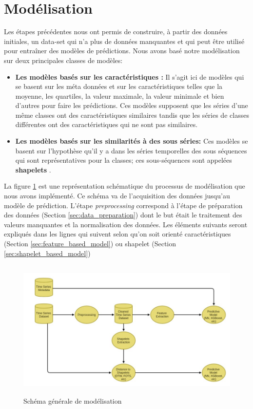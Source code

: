 \section{Modélisation}
Les étapes précédentes nous ont permis de construire, à partir des données initiales, un data-set qui n'a plus de données manquantes et qui peut être utilisé pour entraîner des modèles de prédictions. Nous avons basé notre modélisation sur deux principales classes de modèles:
\begin{itemize}
    \item \textbf{Les modèles basés sur les caractéristiques :} Il s'agit ici de modèles qui se basent sur les méta données et sur les caractéristiques telles que la moyenne, les quartiles, la valeur maximale, la valeur minimale et bien d'autres pour faire les prédictions. Ces modèles supposent que les séries d'une même classes ont des caractéristiques similaires tandis que les séries de classes différentes ont des caractéristiques qui ne sont pas similaires.
    \item \textbf{Les modèles basés sur les similarités à des sous séries:} Ces modèles se basent sur l'hypothèse qu'il y a dans les séries temporelles des sous séquences qui sont représentatives pour la classes; ces sous-séquences sont appelées \textbf{shapelets} \citep{ye2009time}.
\end{itemize}
La figure \ref{fig:modeling_shema} est une représentation schématique du processus de modélisation que nous avons implémenté. Ce schéma va de l'acquisition des données jusqu'au modèle de prédiction. L'étape \textit{preprocessing} correspond à l'étape de préparation des données (Section \ref{sec:data_preparation}) dont le but était le traitement des valeurs manquantes et la normalisation des données. Les éléments suivants seront expliqués dans les lignes qui suivent selon qu'on soit orienté caractéristiques (Section \ref{sec:feature_based_model}) ou shapelet (Section \ref{sec:shapelet_based_model})

\begin{figure}[!h]
    \centering
    \includegraphics[width=12cm,height=7cm]{report/figures/modeling-schema.jpg}
    \caption{Schéma générale de modélisation}
    \label{fig:modeling_shema}
\end{figure}


